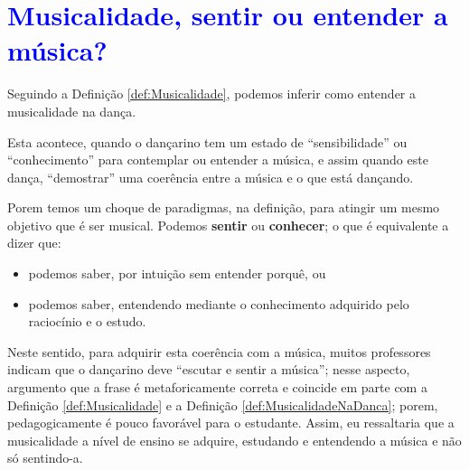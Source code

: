 
\section{\textcolor{blue}{Musicalidade, sentir ou entender a música?}}
Seguindo a Definição \ref{def:Musicalidade}, podemos inferir como entender a musicalidade na dança.
\begin{definition} 
\label{def:MusicalidadeNaDanca}
Esta acontece, quando o dançarino tem um estado de ``sensibilidade'' ou ``conhecimento'' para contemplar ou entender a música,
e assim quando este dança, ``demostrar'' uma coerência entre a música e o que está dançando.
\end{definition}

Porem temos um choque de paradigmas, na definição, para atingir um mesmo objetivo que é ser musical.
Podemos \textbf{sentir} ou \textbf{conhecer}; o que é equivalente a dizer que:
\begin{itemize} 
\item podemos saber, por intuição sem entender porquê, ou
\item podemos saber, entendendo mediante o conhecimento adquirido pelo raciocínio e o estudo.\\
\end{itemize}



Neste sentido, para adquirir esta coerência com a música, 
muitos professores indicam que o dançarino deve ``escutar e sentir a música'';
nesse aspecto, argumento que a frase é metaforicamente correta e coincide em parte com 
a Definição \ref{def:Musicalidade} e a Definição \ref{def:MusicalidadeNaDanca};
porem, pedagogicamente  é pouco favorável para o estudante.
Assim, eu ressaltaria que a musicalidade a nível de ensino se adquire,
estudando e entendendo a música e não só sentindo-a.
 
